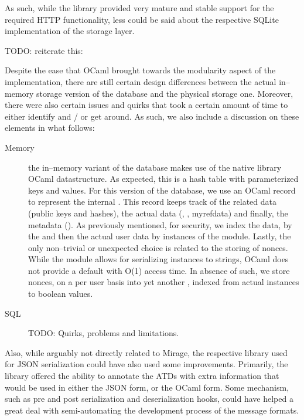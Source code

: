As such, while the  library provided very mature and stable support for the required HTTP functionality, less could be said about the respective SQLite implementation of the storage layer.

TODO: reiterate this:

Despite the ease that OCaml brought towards the modularity aspect of the implementation, there are still certain design differences between the actual in--memory storage version of the database and the physical storage one.
Moreover, there were also certain issues and quirks that took a certain amount of time to either identify and / or get around.
As such, we also include a discussion on these elements in what follows:
\begin{description}
  \item[Memory] the in--memory variant of the database makes use of the native library OCaml  datastructure.
  As expected, this is a hash table with parameterized keys and values.
  For this version of the database, we use an OCaml record to represent the internal .
  This record keeps track of the  related data (public keys and hashes), the actual data (, , myref{data}) and finally, the metadata ().
  As previously mentioned, for security, we index the  data, by the  and then the actual user data by instances of the  module.
  Lastly, the only non--trivial or unexpected choice is related to the storing of nonces.
  While the  module allows for serializing instances to strings, OCaml does not provide a default  with O(1) access time.
  In absence of such, we store nonces, on a per user basis into yet another , indexed from actual  instances to boolean values.

  \item[SQL] TODO: Quirks, problems and limitations.
\end{description}

Also, while arguably not directly related to Mirage, the respective library used for JSON serialization could have also used some improvements.
Primarily, the library offered the ability to annotate the ATDs with extra information that would be used in either the JSON form, or the OCaml form.
Some mechanism, such as pre and post serialization and deserialization hooks, could have helped a great deal with semi-automating the development process of the message formats.

